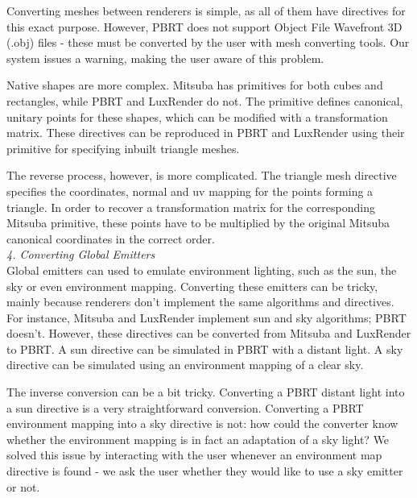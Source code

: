 Converting meshes between renderers is simple, as all of them have directives 
for this exact purpose. However, PBRT does not support Object File Wavefront 3D 
(.obj) files - these must be converted by the user with mesh converting tools. 
Our system issues a warning, making the user aware of this problem.

Native shapes are more complex. Mitsuba has primitives for both cubes and 
rectangles, while PBRT and LuxRender do not. The primitive defines canonical, 
unitary points for these shapes, which can be modified with a transformation 
matrix. These directives can be reproduced in PBRT and LuxRender using their 
primitive for specifying inbuilt triangle meshes. 

The reverse process, however, is more complicated. The triangle mesh directive 
specifies the coordinates, normal and uv mapping for the points forming a 
triangle. In order to recover a transformation matrix for the corresponding 
Mitsuba primitive, these points have to be multiplied by the original Mitsuba 
canonical coordinates in the correct order. \\

\textit{4. Converting Global Emitters} \\
Global emitters can used to emulate environment lighting, such as the sun, the 
sky or even environment mapping. Converting these emitters can be tricky, mainly 
because renderers don't implement the same algorithms and directives. For 
instance, Mitsuba and LuxRender implement sun and sky algorithms; PBRT doesn't. 
However, these directives can be converted from Mitsuba and LuxRender to PBRT. A 
sun directive can be simulated in PBRT with a distant light. A sky directive can 
be simulated using an environment mapping of a clear sky. 

The inverse conversion can be a bit tricky. Converting a PBRT distant light into 
a sun directive is a very straightforward conversion. Converting a PBRT 
environment mapping into a sky directive is not: how could the converter know 
whether the environment mapping is in fact an adaptation of a sky light? We 
solved this issue by interacting with the user whenever an environment map 
directive is found - we ask the user whether they would like to use a sky 
emitter or not.
